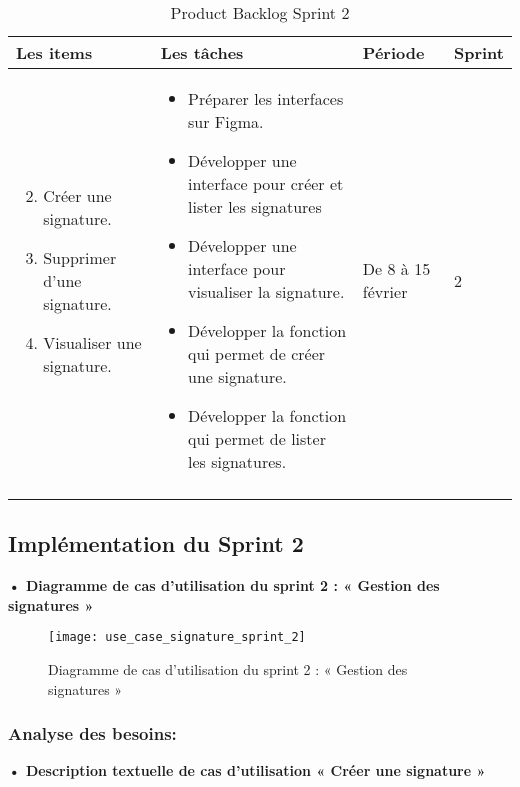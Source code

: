 \begin{longtable}{|p{4cm}|p{7cm}|p{2cm}|p{2cm}|}
  \hline
  \textbf{Les items} &\textbf{Les tâches} & \textbf{Période} & \textbf{Sprint} \\
  \hline
  \vspace{-\baselineskip}
  \begin{enumerate}
    \setcounter{enumi}{1}
    \itemsep0em 
      \item Créer une signature.
      \item Supprimer d'une signature.
      \item Visualiser une signature.

  \end{enumerate}
  &
  \vspace{-\baselineskip}
  \begin{itemize}
    \itemsep0em 
    \item Préparer les interfaces sur Figma.
    \item Développer une interface pour créer et lister les signatures
    \item Développer une interface pour visualiser la signature.
    \item Développer la fonction qui permet de créer une signature.
    \item Développer la fonction qui permet de lister les signatures.
  \end{itemize}
  &
  De 8 à 15 février  
  &
  2
  \\
  \hline
  \caption{Product Backlog Sprint 2}


\end{longtable}

\subsection{Implémentation du Sprint 2}
\textbf{•	Diagramme de cas d'utilisation du sprint 2 : « Gestion des signatures »}

\begin{figure}[h]
  \centering
  \texttt{[image: use\_case\_signature\_sprint\_2]}
  \caption{Diagramme de cas d'utilisation du sprint 2 : « Gestion des signatures »}
  \label{fig:UseCaseDiagram}
\end{figure}

\subsubsection{Analyse des besoins:}
\textbf{•	Description textuelle de cas d'utilisation « Créer une signature »}

